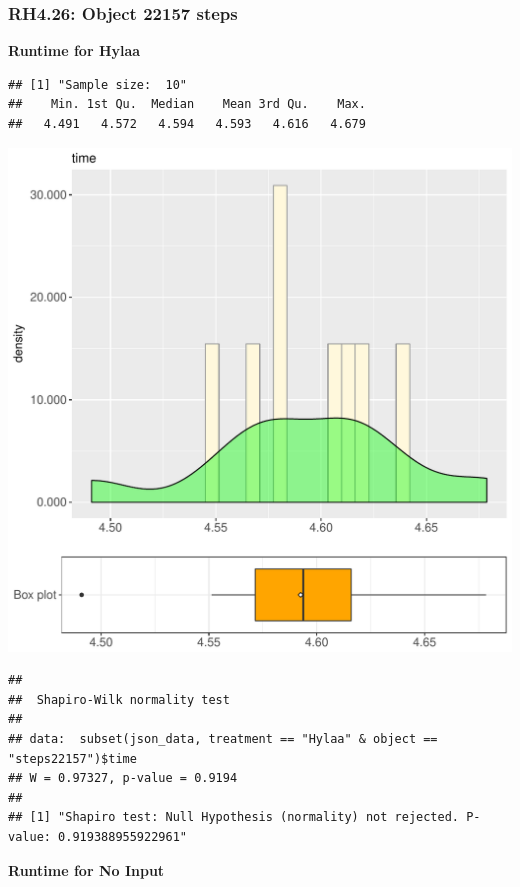 \documentclass{article}\usepackage[]{graphicx}\usepackage[]{color}
\makeatletter
\def\maxwidth{ %
  \ifdim\Gin@nat@width>\linewidth
    \linewidth
  \else
    \Gin@nat@width
  \fi
}
\newenvironment{kframe}{%
 \def\at@end@of@kframe{}%
 \ifinner\ifhmode%
  \def\at@end@of@kframe{\end{minipage}}%
  \begin{minipage}{\columnwidth}%
 \fi\fi%
 \def\FrameCommand##1{\hskip\@totalleftmargin \hskip-\fboxsep
 \colorbox{shadecolor}{##1}\hskip-\fboxsep
     \hskip-\linewidth \hskip-\@totalleftmargin \hskip\columnwidth}%
 \MakeFramed {\advance\hsize-\width
   \@totalleftmargin\z@ \linewidth\hsize
   \@setminipage}}%
 {\par\unskip\endMakeFramed%
 \at@end@of@kframe}
\newenvironment{knitrout}{}{} %
\makeatother
\begin{document}
\subsubsection{RH4.26: Object 22157 steps}

 \textbf{Runtime for Hylaa}
\begin{knitrout}
\color{fgcolor}\begin{kframe}
\begin{verbatim}
## [1] "Sample size:  10"
##    Min. 1st Qu.  Median    Mean 3rd Qu.    Max. 
##   4.491   4.572   4.594   4.593   4.616   4.679
\end{verbatim}
\end{kframe}
\includegraphics[width=\maxwidth]{figure/RH4_Hylaa_steps22157-1} 
\begin{kframe}\begin{verbatim}
## 
## 	Shapiro-Wilk normality test
## 
## data:  subset(json_data, treatment == "Hylaa" & object == "steps22157")$time
## W = 0.97327, p-value = 0.9194
## 
## [1] "Shapiro test: Null Hypothesis (normality) not rejected. P-value: 0.919388955922961"
\end{verbatim}
\end{kframe}
\end{knitrout}
 \textbf{Runtime for No Input}
\end{document}
